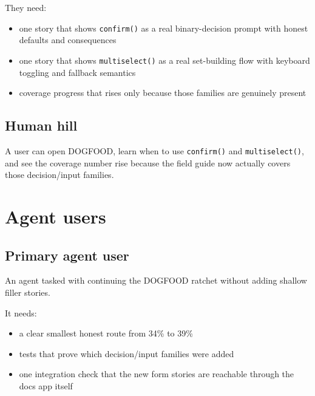 They need:

\begin{itemize}
\tightlist
\item
  one story that shows \texttt{c\allowbreak{}o\allowbreak{}n\allowbreak{}f\allowbreak{}i\allowbreak{}r\allowbreak{}m\allowbreak{}(\allowbreak{})} as a real binary-decision prompt with honest defaults and consequences
\item
  one story that shows \texttt{m\allowbreak{}u\allowbreak{}l\allowbreak{}t\allowbreak{}i\allowbreak{}s\allowbreak{}e\allowbreak{}l\allowbreak{}e\allowbreak{}c\allowbreak{}t\allowbreak{}(\allowbreak{})} as a real set-building flow with keyboard toggling and fallback semantics
\item
  coverage progress that rises only because those families are genuinely present
\end{itemize}

\subsection{Human hill}\label{record-071-human-hill}

A user can open DOGFOOD, learn when to use \texttt{c\allowbreak{}o\allowbreak{}n\allowbreak{}f\allowbreak{}i\allowbreak{}r\allowbreak{}m\allowbreak{}(\allowbreak{})} and \texttt{m\allowbreak{}u\allowbreak{}l\allowbreak{}t\allowbreak{}i\allowbreak{}s\allowbreak{}e\allowbreak{}l\allowbreak{}e\allowbreak{}c\allowbreak{}t\allowbreak{}(\allowbreak{})}, and see the coverage number rise because the field guide now actually covers those decision/input families.

\section{Agent users}\label{record-071-agent-users}

\subsection{Primary agent user}\label{record-071-primary-agent-user}

An agent tasked with continuing the DOGFOOD ratchet without adding shallow filler stories.

It needs:

\begin{itemize}
\tightlist
\item
  a clear smallest honest route from 34\% to 39\%
\item
  tests that prove which decision/input families were added
\item
  one integration check that the new form stories are reachable through the docs app itself
\end{itemize}

